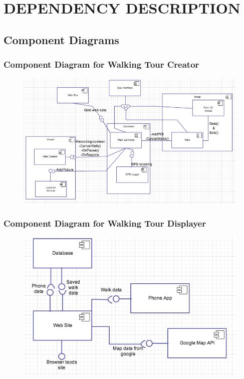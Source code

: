 \documentclass{project}
\begin{document}
\newpage


\section{DEPENDENCY DESCRIPTION}
\subsection{Component Diagrams}

\subsubsection{Component Diagram for Walking Tour Creator}
\begin{figure}[h] 
    \includegraphics[width=15cm]{compontent_diagram_WTC.png}
\end{figure}

\newpage

\subsubsection{Component Diagram for Walking Tour Displayer}
\begin{figure}[h] 
    \includegraphics[width=15cm]{compontent_diagram_WTD.png}
\end{figure}
\end{document}
